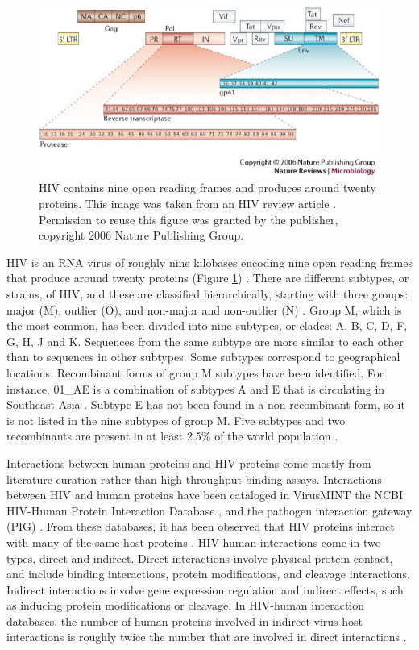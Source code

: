 \begin{figure}
\begin{center}
\includegraphics[scale=0.75]{figs/hiv_proteins}
\end{center}
\caption[HIV genome]{\small HIV contains nine open reading frames and
  produces around twenty proteins. This image was taken from an HIV
  review article \cite{lengauer2006bioinformatics}. Permission to
  reuse this figure was granted by the publisher, copyright 2006
  Nature Publishing Group. \label{fig:hiv_proteins}}
\end{figure}

HIV is an RNA virus of roughly nine kilobases encoding nine open reading
frames that produce around twenty proteins (Figure
\ref{fig:hiv_proteins}) \cite{frankel2003hiv}. There are different
subtypes, or strains, of HIV, and these are classified hierarchically,
starting with three groups: major (M), outlier (O), and non-major and
non-outlier (N) \cite{taylor08}. Group M, which is the most common,
has been divided into nine subtypes, or clades: A, B, C, D, F, G, H, J
and K. Sequences from the same subtype are more similar to each other
than to sequences in other subtypes. Some subtypes correspond to
geographical locations. Recombinant forms of group M subtypes have
been identified. For instance, 01\_AE is a combination of subtypes A
and E that is circulating in Southeast Asia \cite{taylor08}. Subtype E
has not been found in a non recombinant form, so it is not listed in
the nine subtypes of group M. Five subtypes and two recombinants are
present in at least 2.5\% of the world population \cite{taylor08}.

Interactions between human proteins and HIV proteins come mostly from
literature curation rather than high throughput binding
assays. Interactions between HIV and human proteins have been
cataloged in VirusMINT \cite{chatr08} the NCBI HIV-Human Protein
Interaction Database \cite{ptak08}, and the pathogen interaction
gateway (PIG) \cite{driscoll2009pig}. From these databases, it has
been observed that HIV proteins interact with many of the same host
proteins \cite{fu09}. HIV-human interactions come in two types, direct
and indirect. Direct interactions involve physical protein contact,
and include binding interactions, protein modifications, and cleavage
interactions. Indirect interactions involve gene expression regulation
and indirect effects, such as inducing protein modifications or
cleavage. In HIV-human interaction databases, the number of human
proteins involved in indirect virus-host interactions is roughly twice
the number that are involved in direct interactions \cite{fu09}.

